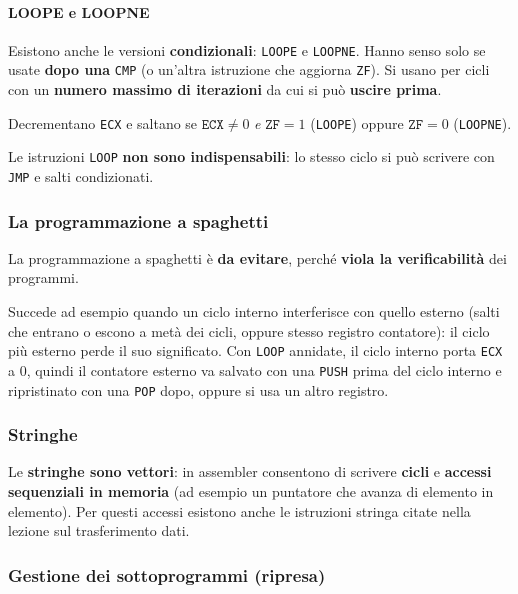 \documentclass[11pt,a4paper]{article}
\begin{document}
\paragraph*{LOOPE e LOOPNE}

Esistono anche le versioni \textbf{condizionali}: \texttt{LOOPE} e \texttt{LOOPNE}. Hanno senso solo se usate \textbf{dopo una} \texttt{CMP} (o un'altra istruzione che aggiorna \texttt{ZF}). Si usano per cicli con un \textbf{numero massimo di iterazioni} da cui si può \textbf{uscire prima}.

\begin{integrazione}
Decrementano \texttt{ECX} e saltano se $\texttt{ECX}\neq 0$ \emph{e} $\texttt{ZF}=1$ (\texttt{LOOPE}) oppure $\texttt{ZF}=0$ (\texttt{LOOPNE}).
\end{integrazione}

Le istruzioni \texttt{LOOP} \textbf{non sono indispensabili}: lo stesso ciclo si può scrivere con \texttt{JMP} e salti condizionati.

\subsubsection*{La programmazione a spaghetti}

La programmazione a spaghetti è \textbf{da evitare}, perché \textbf{viola la verificabilità} dei programmi.

\begin{integrazione}
Succede ad esempio quando un ciclo interno interferisce con quello esterno (salti che entrano o escono a metà dei cicli, oppure stesso registro contatore): il ciclo più esterno perde il suo significato. Con \texttt{LOOP} annidate, il ciclo interno porta \texttt{ECX} a 0, quindi il contatore esterno va salvato con una \texttt{PUSH} prima del ciclo interno e ripristinato con una \texttt{POP} dopo, oppure si usa un altro registro.
\end{integrazione}

\subsubsection*{Stringhe}

Le \textbf{stringhe sono vettori}: in assembler consentono di scrivere \textbf{cicli} e \textbf{accessi sequenziali in memoria} (ad esempio un puntatore che avanza di elemento in elemento). Per questi accessi esistono anche le istruzioni stringa citate nella lezione sul trasferimento dati.

\subsubsection*{Gestione dei sottoprogrammi (ripresa)}
\end{document}

